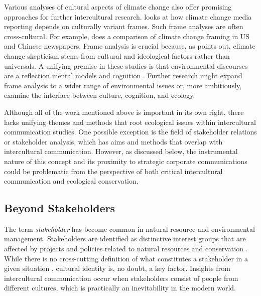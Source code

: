 Various analyses of cultural aspects of climate change also offer promising approaches for further intercultural research. \cite*{Krøvel2011a} looks at how climate change media reporting depends on culturally variant frames. Such frame analyses are often cross-cultural. For example, \cite{Xie2015a} does a comparison of climate change framing in US and Chinese newspapers. Frame analysis is crucial because, as \cite*{Rudiak-Gould2013a} points out, climate change skepticism stems from cultural and ideological factors rather than universals. A unifying premise in these studies is that environmental discourses are a reflection mental models and cognition \citep{Lakoff2010a}. Further research might expand frame analysis to a wider range of environmental issues or, more ambitiously, examine the interface between culture, cognition, and ecology.

Although all of the work mentioned above is important in its own right, there lacks unifying themes and methods that root ecological issues within intercultural communication studies. One possible exception is the field of stakeholder relations or stakeholder analysis, which has aims and methods that overlap with intercultural communication. However, as discussed below, the instrumental nature of this concept and its proximity to strategic corporate communications could be problematic from the perspective of both critical intercultural communication and ecological conservation. 

\subsection{Beyond Stakeholders}

The term \textit{stakeholder} has become common in natural resource and environmental management. Stakeholders are identified as distinctive interest groups that are affected by projects and policies related to natural resources and conservation \citep{Reed2009}. While there is no cross-cutting definition of what constitutes a stakeholder in a given situation \citep{Billgren2008}, cultural identity is, no doubt, a key factor. Insights from intercultural communication occur when stakeholders consist of people from different cultures, which is practically an inevitability in the modern world. 

